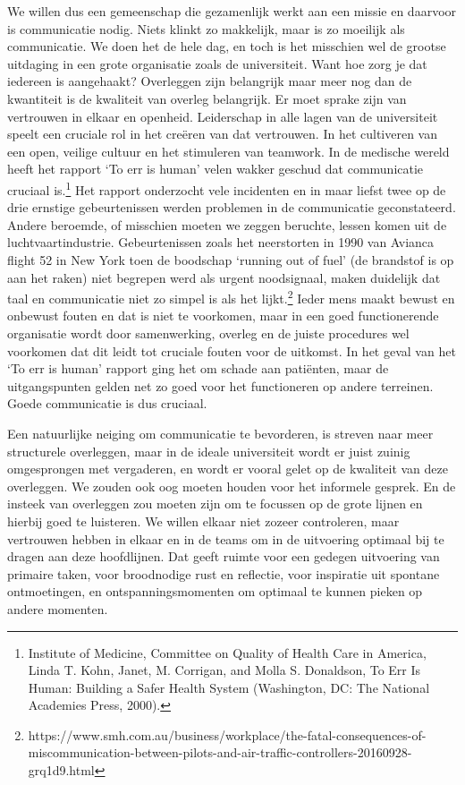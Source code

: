 \documentclass[empirical, authordate, ]{new-jote-article}
\begin{document}
	We willen dus een gemeenschap die gezamenlijk werkt aan een missie en daarvoor is communicatie nodig. Niets klinkt zo makkelijk, maar is zo moeilijk als communicatie. We doen het de hele dag, en toch is het misschien wel de grootse uitdaging in een grote organisatie zoals de universiteit. Want hoe zorg je dat iedereen is aangehaakt? Overleggen zijn belangrijk maar meer nog dan de kwantiteit is de kwaliteit van overleg belangrijk. Er moet sprake zijn van vertrouwen in elkaar en openheid. Leiderschap in alle lagen van de universiteit speelt een cruciale rol in het creëren van dat vertrouwen. In het cultiveren van een open, veilige cultuur en het stimuleren van teamwork. In de medische wereld heeft het rapport ‘To err is human' velen wakker geschud dat communicatie cruciaal is.\footnote{Institute of Medicine, Committee on Quality of Health Care in America, Linda T. Kohn, Janet, M. Corrigan, and Molla S. Donaldson, To Err Is Human: Building a Safer Health System (Washington, DC: The National Academies Press, 2000).} Het rapport onderzocht vele incidenten en in maar liefst twee op de drie ernstige gebeurtenissen werden problemen in de communicatie geconstateerd. Andere beroemde, of misschien moeten we zeggen beruchte, lessen komen uit de luchtvaartindustrie. Gebeurtenissen zoals het neerstorten in 1990 van Avianca flight 52 in New York toen de boodschap ‘running out of fuel' (de brandstof is op aan het raken) niet begrepen werd als urgent noodsignaal, maken duidelijk dat taal en communicatie niet zo simpel is als het lijkt.\footnote{https://www.smh.com.au/business/workplace/the-fatal-consequences-of-miscommunication-between-pilots-and-air-traffic-controllers-20160928-grq1d9.html} Ieder mens maakt bewust en onbewust fouten en dat is niet te voorkomen, maar in een goed functionerende organisatie wordt door samenwerking, overleg en de juiste procedures wel voorkomen dat dit leidt tot cruciale fouten voor de uitkomst. In het geval van het ‘To err is human' rapport ging het om schade aan patiënten, maar de uitgangspunten gelden net zo goed voor het functioneren op andere terreinen. Goede communicatie is dus cruciaal.



	Een natuurlijke neiging om communicatie te bevorderen, is streven naar meer structurele overleggen, maar in de ideale universiteit wordt er juist zuinig omgesprongen met vergaderen, en wordt er vooral gelet op de kwaliteit van deze overleggen. We zouden ook oog moeten houden voor het informele gesprek. En de insteek van overleggen zou moeten zijn om te focussen op de grote lijnen en hierbij goed te luisteren. We willen elkaar niet zozeer controleren, maar vertrouwen hebben in elkaar en in de teams om in de uitvoering optimaal bij te dragen aan deze hoofdlijnen. Dat geeft ruimte voor een gedegen uitvoering van primaire taken, voor broodnodige rust en reflectie, voor inspiratie uit spontane ontmoetingen, en ontspanningsmomenten om optimaal te kunnen pieken op andere momenten.
\end{document}
